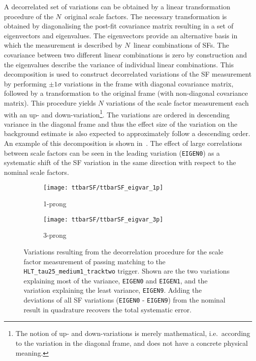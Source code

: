 A decorrelated set of variations can be obtained by a linear
transformation procedure of the $N$~original scale factors. The
necessary transformation is obtained by diagonalising the post-fit
covariance matrix resulting in a set of eigenvectors and
eigenvalues. The eigenvectors provide an alternative basis in which
the measurement is described by $N$~linear combinations of SFs. The
covariance between two different linear combinations is zero by
construction and the eigenvalues describe the variance of individual
linear combinations. This decomposition is used to construct
decorrelated variations of the SF measurement by performing
$\pm 1 \sigma$ variations in the frame with diagonal covariance
matrix, followed by a transformation to the original frame (with
non-diagonal covariance matrix). This procedure yields $N$ variations
of the scale factor measurement each with an up- and
down-variation\footnote{The notion of up- and down-variations is
  merely mathematical, i.e.\ according to the variation in the
  diagonal frame, and does not have a concrete physical meaning.}. The
variations are ordered in descending variance in the diagonal frame
and thus the effect size of the variation on the background estimate
is also expected to approximately follow a descending order. An example of this
decomposition is shown in~. The
effect of large correlations between scale factors can be seen in the
leading variation (\texttt{EIGEN0}) as a systematic shift of the SF
variation in the same direction with respect to the nominal scale
factors.

\begin{figure}[htbp]
  \centering

  \begin{subfigure}[t]{.495\textwidth}
    \texttt{[image: ttbarSF/ttbarSF\_eigvar\_1p]}
    \caption{1-prong \tauhadvis}
    \label{fig:ttbarSF_eigenvariations_1p}
  \end{subfigure}\hfill%
  \begin{subfigure}[t]{.495\textwidth}
    \texttt{[image: ttbarSF/ttbarSF\_eigvar\_3p]}
    \caption{3-prong \tauhadvis}
    \label{fig:ttbarSF_eigenvariations_3p}
  \end{subfigure}

  \caption{Variations resulting from the decorrelation procedure for
    the scale factor measurement of \tauhadvis passing matching to the
    \texttt{HLT\_tau25\_medium1\_tracktwo} trigger. Shown are the two
    variations explaining most of the variance, \texttt{EIGEN0} and
    \texttt{EIGEN1}, and the variation explaining the least variance,
    \texttt{EIGEN9}. Adding the deviations of all SF variations
    (\texttt{EIGEN0} - \texttt{EIGEN9}) from the nominal result in
    quadrature recovers the total systematic error.}
  \label{fig:ttbarSF_eigenvariations}
\end{figure}


